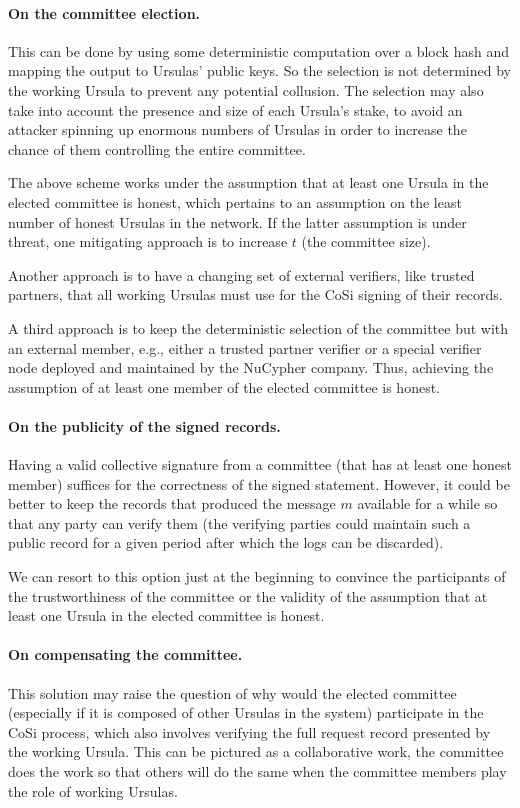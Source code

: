 \paragraph{On the committee election.} This can be done
by using some deterministic computation over a block hash and mapping
the output to Ursulas' public keys. So the selection is not determined by the
working Ursula to prevent any potential collusion. The selection may also take into account the presence and size of each Ursula's stake, to avoid an attacker spinning up enormous numbers of Ursulas in order to increase the chance of them controlling the entire committee.


The above scheme works under the assumption that at least one Ursula
in the elected committee is honest, which pertains to an assumption on the
least number of honest Ursulas in the network. If the latter assumption is under threat, one mitigating approach is to increase $t$ (the committee size).


Another approach is to have a changing set of external verifiers, like
trusted partners, that all working Ursulas must use for the CoSi signing
of their records.


A third approach is to keep the deterministic selection of the committee
but with an external member, e.g., either a trusted partner verifier
or a special verifier node deployed and maintained by the NuCypher company.
Thus, achieving the assumption of at least one member of the elected
committee is honest.


\paragraph{On the publicity of the signed records.} Having a 
valid collective signature from a committee (that has at least one honest 
member) suffices for the correctness of the signed statement. However, 
it could be better to keep the records that produced the message $m$  
available for a while so that any party can verify them (the verifying
parties could maintain such a public record for a given period after which
the logs can be discarded). 


We can resort to this option just at the beginning to convince the 
participants of the trustworthiness of the committee or the validity of the
assumption that at least one Ursula in the elected committee is honest.


\paragraph{On compensating the committee.} This solution may 
raise the question of why would the elected committee (especially if it 
is composed of other Ursulas in the system) participate in the CoSi 
process, which also involves verifying the full request record presented 
by the working Ursula. This can be pictured as a collaborative
work, the committee does the work so that others will do the same
when the committee members play the role of working Ursulas.


